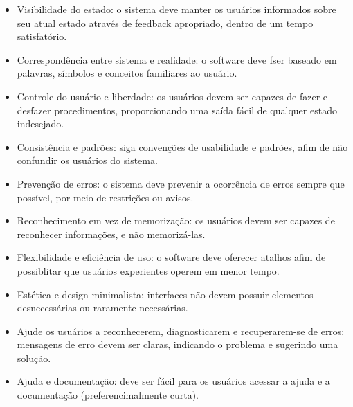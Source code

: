 \begin{itemize}
    \item Visibilidade do estado: o sistema deve manter os usuários informados sobre seu atual estado através de feedback apropriado, dentro de um tempo satisfatório.
    \item Correspondência entre sistema e realidade: o software deve fser baseado em palavras, símbolos e conceitos familiares ao usuário.
    \item Controle do usuário e liberdade: os usuários devem ser capazes de fazer e desfazer procedimentos, proporcionando uma saída fácil de qualquer estado indesejado.
    \item Consistência e padrões: siga convenções de usabilidade e padrões, afim de não confundir os usuários do sistema.
    \item Prevenção de erros: o sistema deve prevenir a ocorrência de erros sempre que possível, por meio de restrições ou avisos.
    \item Reconhecimento em vez de memorização: os usuários devem ser capazes de reconhecer informações, e não memorizá-las.
    \item Flexibilidade e eficiência de uso: o software deve oferecer atalhos  afim de possiblitar que usuários experientes operem em menor tempo.
    \item Estética e design minimalista: interfaces não devem possuir elementos desnecessárias ou raramente necessárias.
    \item Ajude os usuários a reconhecerem, diagnosticarem e recuperarem-se de erros: mensagens de erro devem ser claras, indicando o problema e sugerindo uma solução.
    \item Ajuda e documentação: deve ser fácil para os usuários acessar a ajuda e a documentação (preferencimalmente curta).
\end{itemize}